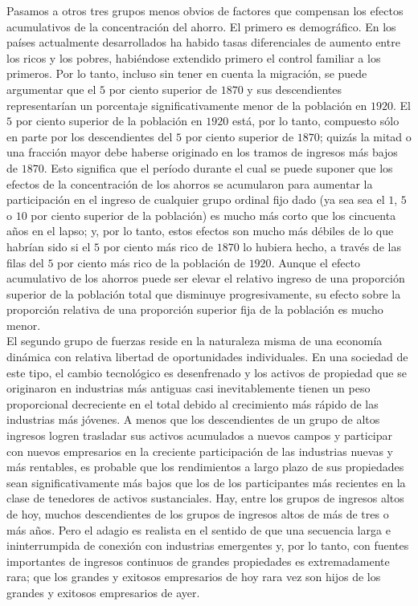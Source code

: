 Pasamos a otros tres grupos menos obvios de factores que compensan los efectos acumulativos de la concentración del ahorro. El primero es demográfico. En los países actualmente desarrollados ha habido tasas diferenciales de aumento entre los ricos y los pobres, habiéndose extendido primero el control familiar a los primeros. Por lo tanto, incluso sin tener en cuenta la migración, se puede argumentar que el $5$ por ciento superior de $1870$ y sus descendientes representarían un porcentaje significativamente menor de la población en $1920$. 
El $5$ por ciento superior de la población en $1920$ está, por lo tanto, compuesto sólo en parte por los descendientes del $5$ por ciento superior de $1870$; quizás la mitad o una fracción mayor debe haberse originado en los tramos de ingresos más bajos de $1870$. Esto significa que el período durante el cual se puede suponer que los efectos de la concentración de los ahorros se acumularon para aumentar la participación en el ingreso de cualquier grupo ordinal fijo dado (ya sea sea el $1$, $5$ o $10$ por ciento superior de la población) es mucho más corto que los cincuenta años en el lapso; y, por lo tanto, estos efectos son mucho más débiles de lo que habrían sido si el $5$ por ciento más rico de $1870$ lo hubiera hecho, a través de las filas del $5$ por ciento más rico de la población de $1920$. Aunque el efecto acumulativo de los ahorros puede ser elevar el relativo ingreso de una proporción superior de la población total que disminuye progresivamente, su efecto sobre la proporción relativa de una proporción superior fija de la población es mucho menor.\\

El segundo grupo de fuerzas reside en la naturaleza misma de una economía dinámica con relativa libertad de oportunidades individuales. En una sociedad de este tipo, el cambio tecnológico es desenfrenado y los activos de propiedad que se originaron en industrias más antiguas casi inevitablemente tienen un peso proporcional decreciente en el total debido al crecimiento más rápido de las industrias más jóvenes. 
A menos que los descendientes de un grupo de altos ingresos logren trasladar sus activos acumulados a nuevos campos y participar con nuevos empresarios en la creciente participación de las industrias nuevas y más rentables, es probable que los rendimientos a largo plazo de sus propiedades sean significativamente más bajos que los de los participantes más recientes en la clase de tenedores de activos sustanciales. Hay, entre los grupos de ingresos altos de hoy, muchos descendientes de los grupos de ingresos altos de más de tres o más años. Pero el adagio es realista en el sentido de que una secuencia larga e ininterrumpida de conexión con industrias emergentes y, por lo tanto, con fuentes importantes de ingresos continuos de grandes propiedades es extremadamente rara; que los grandes y exitosos empresarios de hoy rara vez son hijos de los grandes y exitosos empresarios de ayer.\\

